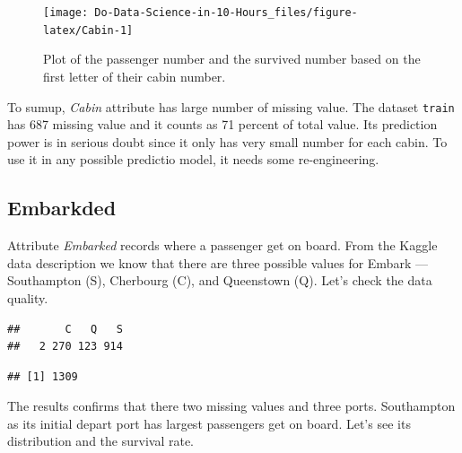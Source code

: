 \documentclass[
]{book}
\newenvironment{Shaded}{\begin{snugshade}}{\end{snugshade}}
\newcommand{\CommentTok}[1]{\textcolor[rgb]{0.56,0.35,0.01}{\textit{#1}}}
\newcommand{\KeywordTok}[1]{\textcolor[rgb]{0.13,0.29,0.53}{\textbf{#1}}}
\newcommand{\NormalTok}[1]{#1}
\newcommand{\OperatorTok}[1]{\textcolor[rgb]{0.81,0.36,0.00}{\textbf{#1}}}
\begin{document}
\begin{figure}

{\centering \texttt{[image: Do-Data-Science-in-10-Hours\_files/figure-latex/Cabin-1]} 

}

\caption{Plot of the passenger number and  the survived number based on the first letter of their cabin number.}\label{fig:Cabin}
\end{figure}

To sumup, \emph{Cabin} attribute has large number of missing value. The dataset \texttt{train} has 687 missing value and it counts as 71 percent of total value. Its prediction power is in serious doubt since it only has very small number for each cabin. To use it in any possible predictio model, it needs some re-engineering.

\hypertarget{embarkded}{%
\subsection{Embarkded}\label{embarkded}}

Attribute \emph{Embarked} records where a passenger get on board. From the Kaggle data description we know that there are three possible values for Embark --- Southampton (S), Cherbourg (C), and Queenstown (Q). Let's check the data quality.

\begin{Shaded}
\end{Shaded}

\begin{verbatim}
##       C   Q   S 
##   2 270 123 914
\end{verbatim}

\begin{Shaded}
\end{Shaded}

\begin{verbatim}
## [1] 1309
\end{verbatim}

The results confirms that there two missing values and three ports. Southampton as its initial depart port has largest passengers get on board. Let's see its distribution and the survival rate.
\end{document}
